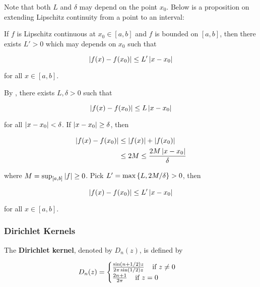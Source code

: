 \documentclass[a4paper,12pt]{article}
\begin{document}
Note that both $L$ and $\delta$ may depend on the point $x_{0}$. Below is a proposition on extending Lipschitz continuity from a point to an interval:\n

\begin{pst}
  If $f$ is Lipschitz continuous at $x_{0}\in[a,b]$ and $f$ is bounded on $[a,b]$, then there exists $L'>0$ which may depends on $x_{0}$ such that

$$\left| f(x)-f(x_{0})\right|\leq L'\left| x-x_{0}\right|$$\s

for all $x\in[a,b]$.\n

\prf By \rdft[\sctd{1}], there exists $L,\delta>0$ such that

$$\left| f(x)-f(x_{0})\right|\leq L\left| x-x_{0}\right|$$\s

for all $\left| x-x_{0}\right|<\delta$. If $\left| x-x_{0}\right|\geq\delta$, then

$$\begin{aligned}[t]
  \left| f(x)-f(x_{0})\right|&\leq\left| f(x)\right|+\left| f(x_{0})\right|\\
  &\leq 2M\leq \frac{2M\left| x-x_{0}\right|}{\delta}
\end{aligned}$$\s

where $M=\sup_{[a,b]}\left| f\right|\geq 0$. Pick $L'=\max\left\{ L,2M/\delta\right\}>0$, then

$$\left| f(x)-f(x_{0})\right|\leq L'\left| x-x_{0}\right|$$\s

for all $x\in[a,b]$.
\end{pst}

\subsubsection{Dirichlet Kernels}
\begin{dft}
  The \textbf{Dirichlet kernel}, denoted by $D_{n}(z)$, is defined by

  $$D_{n}(z)=\begin{cases}
    \frac{\sin(n+1/2)z}{2\pi\sin(1/2)z}\;\;\;\;\text{if }z\neq 0\\
    \frac{2n+1}{2\pi}\;\;\;\;\text{if }z=0
  \end{cases}$$
\end{dft}\n
\end{document}

